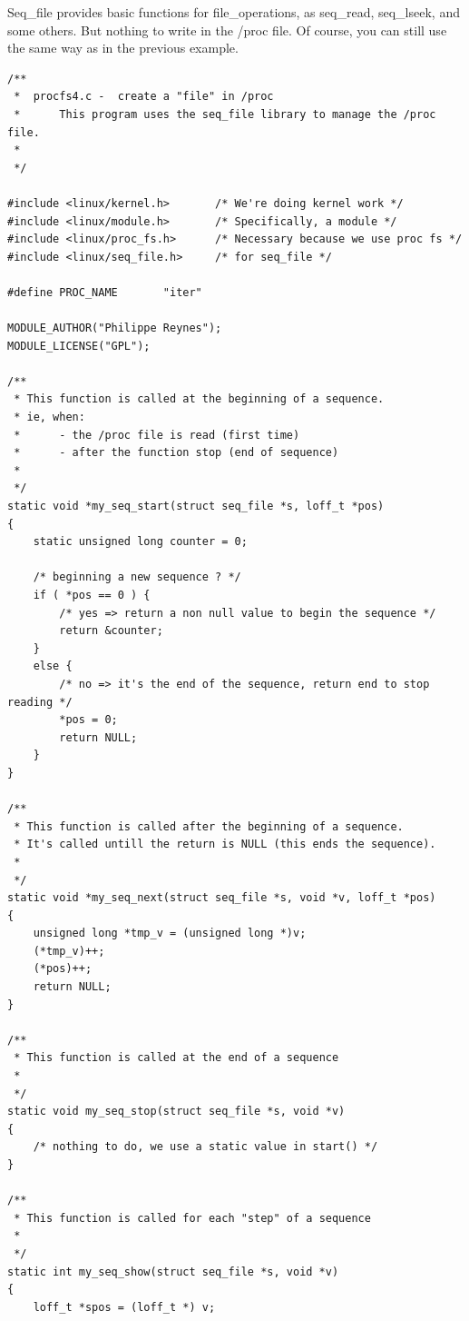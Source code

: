 \documentclass[11pt]{article}
\begin{document}
\begin{center}
\begin{tabular}{}
\\
\end{tabular}
\end{center}
Seq\_file provides basic functions for file\_operations, as seq\_read, seq\_lseek, and some others. But nothing to write in the /proc file. Of course, you can still use the same way as in the previous example.

\begin{verbatim}
/**
 *  procfs4.c -  create a "file" in /proc
 *      This program uses the seq_file library to manage the /proc file.
 *
 */

#include <linux/kernel.h>       /* We're doing kernel work */
#include <linux/module.h>       /* Specifically, a module */
#include <linux/proc_fs.h>      /* Necessary because we use proc fs */
#include <linux/seq_file.h>     /* for seq_file */

#define PROC_NAME       "iter"

MODULE_AUTHOR("Philippe Reynes");
MODULE_LICENSE("GPL");

/**
 * This function is called at the beginning of a sequence.
 * ie, when:
 *      - the /proc file is read (first time)
 *      - after the function stop (end of sequence)
 *
 */
static void *my_seq_start(struct seq_file *s, loff_t *pos)
{
    static unsigned long counter = 0;

    /* beginning a new sequence ? */
    if ( *pos == 0 ) {
        /* yes => return a non null value to begin the sequence */
        return &counter;
    }
    else {
        /* no => it's the end of the sequence, return end to stop reading */
        *pos = 0;
        return NULL;
    }
}

/**
 * This function is called after the beginning of a sequence.
 * It's called untill the return is NULL (this ends the sequence).
 *
 */
static void *my_seq_next(struct seq_file *s, void *v, loff_t *pos)
{
    unsigned long *tmp_v = (unsigned long *)v;
    (*tmp_v)++;
    (*pos)++;
    return NULL;
}

/**
 * This function is called at the end of a sequence
 *
 */
static void my_seq_stop(struct seq_file *s, void *v)
{
    /* nothing to do, we use a static value in start() */
}

/**
 * This function is called for each "step" of a sequence
 *
 */
static int my_seq_show(struct seq_file *s, void *v)
{
    loff_t *spos = (loff_t *) v;


\end{verbatim}
\end{document}
